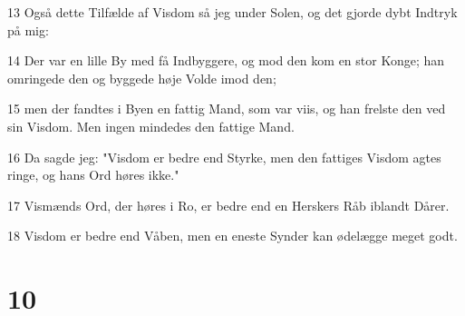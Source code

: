 \par 13 Også dette Tilfælde af Visdom så jeg under Solen, og det gjorde dybt Indtryk på mig:
\par 14 Der var en lille By med få Indbyggere, og mod den kom en stor Konge; han omringede den og byggede høje Volde imod den;
\par 15 men der fandtes i Byen en fattig Mand, som var viis, og han frelste den ved sin Visdom. Men ingen mindedes den fattige Mand.
\par 16 Da sagde jeg: "Visdom er bedre end Styrke, men den fattiges Visdom agtes ringe, og hans Ord høres ikke."
\par 17 Vismænds Ord, der høres i Ro, er bedre end en Herskers Råb iblandt Dårer.
\par 18 Visdom er bedre end Våben, men en eneste Synder kan ødelægge meget godt.

\chapter{10}

